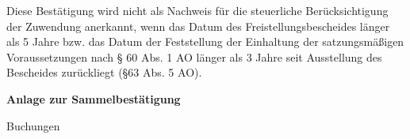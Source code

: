 \documentclass[11pt,ngerman]{scrartcl}
\newcommand{\VAR}[1]{#1}
\begin{document}
Diese Bestätigung wird nicht als Nachweis für die steuerliche Berücksichtigung der Zuwendung anerkannt, wenn das Datum des Freistellungsbescheides länger als 5 Jahre bzw. das Datum der Feststellung der Einhaltung der satzungsmäßigen Voraussetzungen nach § 60 Abs. 1 AO länger als 3 Jahre seit Ausstellung des Bescheides zurückliegt (§63 Abs. 5 AO). 


\clearpage

{\bfseries\large Anlage zur Sammelbestätigung} \vspace*{2em}


\VAR{Buchungen}
\end{document}
